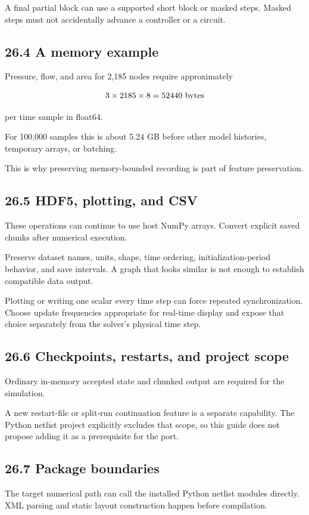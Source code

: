 \documentclass[11pt,a4paper]{article}
\begin{document}
A final partial block can use a supported short block or masked steps. Masked steps must not accidentally advance a controller or a circuit.

\subsection{26.4 A memory example}
Pressure, flow, and area for 2,185 nodes require approximately


\begingroup\small
\[
3\times2185\times8=52440\ {\rm bytes}
\]
\endgroup


per time sample in float64.

For 100,000 samples this is about 5.24 GB before other model histories, temporary arrays, or batching.

This is why preserving memory-bounded recording is part of feature preservation.

\subsection{26.5 HDF5, plotting, and CSV}
These operations can continue to use host NumPy arrays. Convert explicit saved chunks after numerical execution.

Preserve dataset names, units, shape, time ordering, initialization-period behavior, and save intervals. A graph that looks similar is not enough to establish compatible data output.

Plotting or writing one scalar every time step can force repeated synchronization. Choose update frequencies appropriate for real-time display and expose that choice separately from the solver's physical time step.

\subsection{26.6 Checkpoints, restarts, and project scope}
Ordinary in-memory accepted state and chunked output are required for the simulation.

A new restart-file or split-run continuation feature is a separate capability. The Python netlist project explicitly excludes that scope, so this guide does not propose adding it as a prerequisite for the port.

\subsection{26.7 Package boundaries}
The target numerical path can call the installed Python netlist modules directly. XML parsing and static layout construction happen before compilation.
\end{document}
